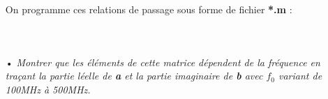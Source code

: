 \documentclass[10pt]{article}
\begin{document}
\begin{itemize}
        On programme ces relations de passage sous forme de fichier \textbf{*.m} :
        \inputminted[linenos]{matlab}{src/Z.m}
        \inputminted[linenos]{matlab}{src/z_normalise.m}
        \inputminted[linenos]{matlab}{src/S.m}


    \item[•] \textit{Montrer que les éléments de cette matrice dépendent de la fréquence en traçant la partie léelle de \textbf{a} et la partie imaginaire de \textbf{b} avec \textbf{$f_0$} variant de 100MHz à 500MHz.}

    \inputminted[linenos,lastline=20]{matlab}{src/BE.m}


\end{itemize}

\subsection{}
\end{document}
